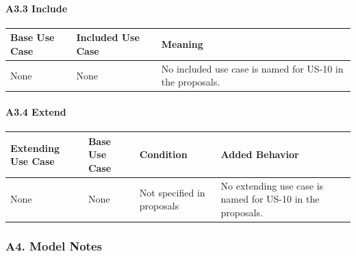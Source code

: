 \documentclass[12pt]{article}
\renewcommand{\baselinestretch}{1.5}
\begin{document}
\hypertarget{sec:a3-3-include}{}
\paragraph*{A3.3 Include}
\par\medskip

\begingroup
\small
\renewcommand{\baselinestretch}{1.0}\selectfont
\renewcommand{\arraystretch}{1.15}
\setlength{\tabcolsep}{6pt}
\begin{longtable}{|>{\raggedright\arraybackslash}p{}|>{\raggedright\arraybackslash}p{}|>{\raggedright\arraybackslash}p{}|}
\hline
\textbf{Base Use Case} & \textbf{Included Use Case} & \textbf{Meaning} \\ \hline
\endhead
None & None & No included use case is named for US-10 in the proposals. \\ \hline
\end{longtable}
\endgroup
\par\medskip

\hypertarget{sec:a3-4-extend}{}
\paragraph*{A3.4 Extend}
\par\medskip

\begingroup
\small
\renewcommand{\baselinestretch}{1.0}\selectfont
\renewcommand{\arraystretch}{1.15}
\setlength{\tabcolsep}{6pt}
\begin{longtable}{|>{\raggedright\arraybackslash}p{}|>{\raggedright\arraybackslash}p{}|>{\raggedright\arraybackslash}p{}|>{\raggedright\arraybackslash}p{}|}
\hline
\textbf{Extending Use Case} & \textbf{Base Use Case} & \textbf{Condition} & \textbf{Added Behavior} \\ \hline
\endhead
None & None & Not specified in proposals & No extending use case is named for US-10 in the proposals. \\ \hline
\end{longtable}
\endgroup
\par\medskip

\hypertarget{sec:a4-model-notes}{}
\subsubsection*{A4. Model Notes}
\par\medskip
\end{document}
